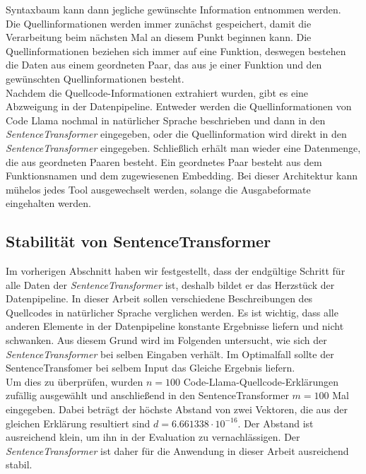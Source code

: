 \documentclass[12pt,letterpaper,ngerman]{article}
\begin{document}
Syntaxbaum kann dann jegliche gewünschte Information entnommen 
werden.\\
Die Quellinformationen werden immer zunächst gespeichert, damit die 
Verarbeitung beim nächsten Mal an diesem Punkt beginnen kann.
Die Quellinformationen beziehen sich immer auf eine Funktion,
deswegen bestehen die Daten aus einem geordneten Paar,
das aus je einer
Funktion und den gewünschten Quellinformationen besteht.\\
Nachdem die Quellcode-Informationen extrahiert wurden, 
gibt es eine Abzweigung in der Datenpipeline. Entweder 
werden die Quellinformationen von Code Llama nochmal in natürlicher 
Sprache beschrieben und dann in den \textit{SentenceTransformer}
eingegeben, oder die Quellinformation wird direkt in den 
\textit{SentenceTransformer} eingegeben. Schließlich erhält man
wieder eine Datenmenge, die aus geordneten Paaren besteht. 
Ein geordnetes Paar besteht
aus dem Funktionsnamen und dem zugewiesenen Embedding. 
Bei dieser Architektur kann mühelos jedes Tool ausgewechselt 
werden, solange die Ausgabeformate eingehalten werden. 
\subsection{Stabilität von SentenceTransformer}
Im vorherigen Abschnitt haben wir festgestellt, dass der endgültige
Schritt für alle Daten der \textit{SentenceTransformer} ist, deshalb
bildet 
er das Herzstück der Datenpipeline. In dieser Arbeit sollen 
verschiedene Beschreibungen des Quellcodes in 
natürlicher Sprache verglichen werden. Es ist wichtig, dass alle 
anderen Elemente in der Datenpipeline konstante Ergebnisse 
liefern und nicht schwanken. Aus diesem Grund wird im Folgenden 
untersucht, wie sich der \textit{SentenceTransformer} bei selben
Eingaben verhält. Im Optimalfall sollte der SentenceTransfomer bei 
selbem Input das Gleiche Ergebnis liefern.\\
Um dies zu überprüfen, wurden $n = 100$ 
Code-Llama-Quellcode-Erklärungen zufällig ausgewählt und 
anschließend in
den SentenceTransformer $m = 100$ Mal eingegeben. Dabei beträgt
der höchste Abstand von zwei Vektoren,
die aus der gleichen Erklärung resultiert sind 
$d = 6.661338\cdot 10^{-16}$. Der 
Abstand ist ausreichend klein, um ihn in der Evaluation zu 
vernachlässigen. Der \textit{SentenceTransformer} ist daher
für die Anwendung in dieser Arbeit ausreichend stabil.
\end{document}
